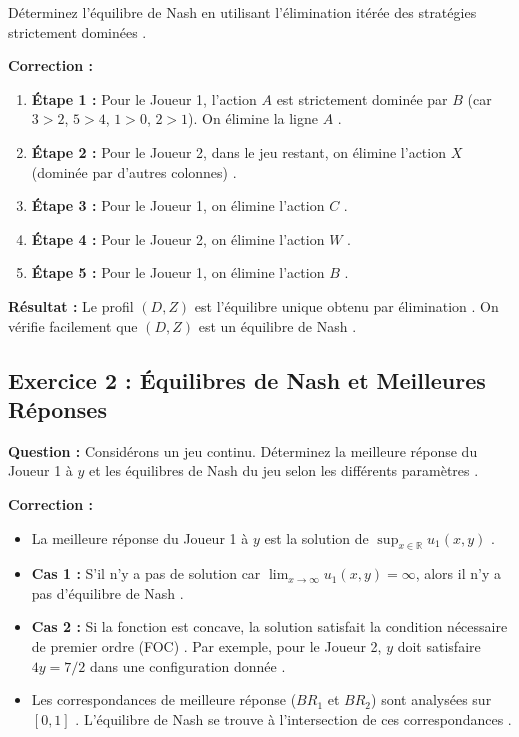 Déterminez l'équilibre de Nash en utilisant l'élimination itérée des stratégies strictement dominées \cite{Note 24 nov. 2025 (4).pdf}.

\textbf{Correction :}
\begin{enumerate}
    \item \textbf{Étape 1 :} Pour le Joueur 1, l'action $A$ est strictement dominée par $B$ (car $3 > 2$, $5 > 4$, $1 > 0$, $2 > 1$). On élimine la ligne $A$ \cite{Note 24 nov. 2025 (4).pdf}.
    \item \textbf{Étape 2 :} Pour le Joueur 2, dans le jeu restant, on élimine l'action $X$ (dominée par d'autres colonnes) \cite{Note 24 nov. 2025 (4).pdf}.
    \item \textbf{Étape 3 :} Pour le Joueur 1, on élimine l'action $C$ \cite{Note 24 nov. 2025 (4).pdf}.
    \item \textbf{Étape 4 :} Pour le Joueur 2, on élimine l'action $W$ \cite{Note 24 nov. 2025 (4).pdf}.
    \item \textbf{Étape 5 :} Pour le Joueur 1, on élimine l'action $B$ \cite{Note 24 nov. 2025 (4).pdf}.
\end{enumerate}
\textbf{Résultat :} Le profil $(D, Z)$ est l'équilibre unique obtenu par élimination \cite{Note 24 nov. 2025 (4).pdf}. On vérifie facilement que $(D, Z)$ est un équilibre de Nash \cite{Note 24 nov. 2025 (4).pdf}.

\subsection{Exercice 2 : Équilibres de Nash et Meilleures Réponses}

\textbf{Question :}
Considérons un jeu continu. Déterminez la meilleure réponse du Joueur 1 à $y$ et les équilibres de Nash du jeu selon les différents paramètres \cite{Note 24 nov. 2025 (4).pdf}.

\textbf{Correction :}
\begin{itemize}
    \item La meilleure réponse du Joueur 1 à $y$ est la solution de $\sup_{x \in \mathbb{R}} u_1(x, y)$ \cite{Note 24 nov. 2025 (4).pdf}.
    \item \textbf{Cas 1 :} S'il n'y a pas de solution car $\lim_{x \to \infty} u_1(x, y) = \infty$, alors il n'y a pas d'équilibre de Nash \cite{Note 24 nov. 2025 (4).pdf}.
    \item \textbf{Cas 2 :} Si la fonction est concave, la solution satisfait la condition nécessaire de premier ordre (FOC) \cite{Note 24 nov. 2025 (4).pdf}. Par exemple, pour le Joueur 2, $y$ doit satisfaire $4y = 7/2$ dans une configuration donnée \cite{Note 24 nov. 2025 (4).pdf}.
    \item Les correspondances de meilleure réponse ($BR_1$ et $BR_2$) sont analysées sur $[0, 1]$ \cite{Note 24 nov. 2025 (4).pdf}. L'équilibre de Nash se trouve à l'intersection de ces correspondances \cite{Note 24 nov. 2025 (4).pdf}.
\end{itemize}

